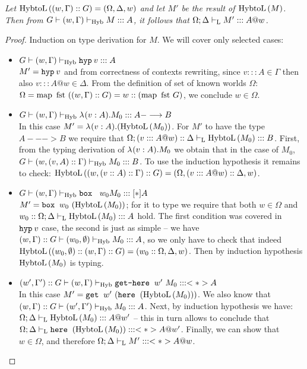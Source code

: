 \begin{theorem} \em
Let $\mbox{${\operatorname{HybtoL}{((w, \Gamma) :: G)}}$} = (\Omega, \Delta, w)$  and let $M'$ be the result of $\mbox{${\operatorname{HybtoL}{(M)}}$}$. 
Then from $G |- (w, \Gamma) |-_{\text{Hyb}} M ::: A$, it follows that $\Omega; \Delta|-_{\text{L}} M' ::: A @ w$.
\begin{proof}
Induction on type derivation for $M$. We will cover only selected cases:
\begin{itemize}
\item $G |- (w, \Gamma) |-_{\text{Hyb}} \mbox{$\operatorname{\texttt{hyp}}_{} {v}$} ::: A$\\
$M' = \mbox{$\operatorname{\texttt{hyp}}_{} {v}$}$ and from correctness of contexts rewriting, since $v:::A \in \Gamma$ then also $v ::: A @ w \in \Delta$. From the definition of set of known worlds $\Omega$:  $\Omega = \mbox{$\operatorname{map}\ {\mbox{$\text{fst}$}{}} \ {((w, \Gamma) :: G)}$} = w :: (\mbox{$\operatorname{map}\ {\mbox{$\text{fst}$}{}} \ {G}$})$, we conclude $w \in \Omega$.

\item $G |- (w, \Gamma) |-_{\text{Hyb}} \mbox{$\lambda_{} (v: A). M_0$} ::: A ---> B$\\
In this case $M' = \mbox{$\lambda_{} (v: A). ($}\mbox{${\operatorname{HybtoL}{(M_0)}}$})$. For $M'$ to have the type $A ---> B$ we require that $\Omega; (v:::A@w) :: \Delta |-_{\text{L}} \mbox{${\operatorname{HybtoL}{(M_0)}}$} ::: B$. First, from the typing derivation of $\mbox{$\lambda_{} (v: A). M_0$}$ we obtain that in the case of $M_0$, $G |- (w, (v, A) :: \Gamma) |-_{\text{Hyb}} M_0 ::: B$. To use the induction hypothesis it remains to check: $\mbox{${\operatorname{HybtoL}{((w, (v::A)::\Gamma) :: G)}}$} = (\Omega, (v:::A@w) :: \Delta, w)$.

\item $G |- (w, \Gamma) |-_\tHyb \bbox {w_0} {M_0} ::: [*]A$\\
$M' = \mbox{$\operatorname{\texttt{box}}_{}\ {w_0}\ {(\mbox{${\operatorname{HybtoL}{(M_0)}}$})}$}$; for it to type we require that both $w \in \Omega$ and ${w_0 :: \Omega; \Delta|-_{\text{L}} \mbox{${\operatorname{HybtoL}{(M_0)}}$} ::: A}$ hold. The first condition was covered in $\mbox{$\operatorname{\texttt{hyp}}_{} {v}$}$ case, the second is just as simple -- we have $(w, \Gamma) :: G |- (w_0, \mbox{$\emptyset$}) |-_{\text{Hyb}} M_0 ::: A$, so we only have to check that indeed $\mbox{${\operatorname{HybtoL}{((w_0, \mbox{$\emptyset$}) :: (w, \Gamma) :: G)}}$} = (w_0::\Omega, \Delta, w)$. Then by induction hypothesis $\mbox{${\operatorname{HybtoL}{(M_0)}}$}$ is typing.

\item $(w', \Gamma') :: G |- (w, \Gamma) |-_{\text{Hyb}} \mbox{$\operatorname{\texttt{get-here}}_{}\ {w'}\ {M_0}$} ::: <*>A$\\
In this case $M' = \mbox{$\operatorname{\texttt{get}}_{}\ {w'}\ {(\mbox{$\operatorname{\texttt{here}}_{}\ {(}$}\mbox{${\operatorname{HybtoL}{(M_0)}}$}))}$}$. We also know that ${(w, \Gamma):: G |- (w', \Gamma') |-_{\text{Hyb}} M_0 ::: A}$. Next, by induction hypothesis we have: $\Omega; \Delta |-_{\text{L}} \mbox{${\operatorname{HybtoL}{(M_0)}}$} ::: A @ w'$ -- this in turn allows to conclude that $\Omega; \Delta |-_{\text{L}} \mbox{$\operatorname{\texttt{here}}_{}\ {(}$}\mbox{${\operatorname{HybtoL}{(M_0)}}$}) ::: <*>A @ w'$. Finally, we can show that $w \in \Omega$, and therefore $\Omega; \Delta |-_{\text{L}} M' ::: <*>A @w$.
\end{itemize}
\end{proof}
\end{theorem}

